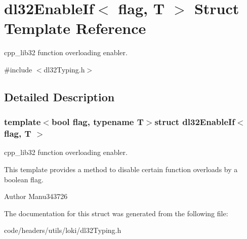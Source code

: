 \hypertarget{structdl32_enable_if}{\section{dl32\-Enable\-If$<$ flag, T $>$ Struct Template Reference}
\label{structdl32_enable_if}
}


cpp\-\_\-lib32 function overloading enabler.  




{\ttfamily \#include $<$dl32\-Typing.\-h$>$}



\subsection{Detailed Description}
\subsubsection*{template$<$bool flag, typename T$>$struct dl32\-Enable\-If$<$ flag, T $>$}

cpp\-\_\-lib32 function overloading enabler. 

This template provides a method to disable certain function overloads by a boolean flag.

\begin{DoxyAuthor}{Author}
Manu343726 
\end{DoxyAuthor}


The documentation for this struct was generated from the following file\-:\begin{DoxyCompactItemize}
\item 
code/headers/utils/loki/dl32\-Typing.\-h\end{DoxyCompactItemize}
